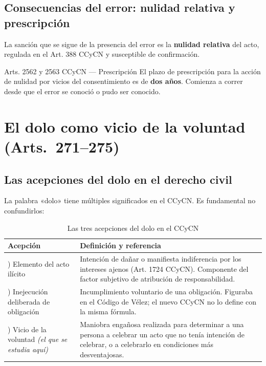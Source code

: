 \documentclass[12pt,oneside]{book}
\begin{document}
\section{Consecuencias del error: nulidad relativa y prescripción}

La sanción que se sigue de la presencia del error es la \textbf{nulidad relativa} del acto, regulada en el Art. 388 CCyCN y susceptible de confirmación.

\begin{articulo}{Arts. 2562 y 2563 CCyCN --- Prescripción}
El plazo de prescripción para la acción de nulidad por vicios del consentimiento es de \textbf{dos años}. Comienza a correr desde que el error se conoció o pudo ser conocido.
\end{articulo}

\chapter{El dolo como vicio de la voluntad (Arts.~271--275)}

\section{Las acepciones del dolo en el derecho civil}

La palabra «dolo» tiene múltiples significados en el CCyCN. Es fundamental no confundirlos:

\begin{table}[H]
\centering
\begin{tabularx}{\textwidth}{>{\raggedright\arraybackslash}p{} >{\raggedright\arraybackslash}X}
\toprule
\textbf{Acepción} & \textbf{Definición y referencia} \\
\midrule
1) Elemento del acto ilícito & Intención de dañar o manifiesta indiferencia por los intereses ajenos (Art. 1724 CCyCN). Componente del factor subjetivo de atribución de responsabilidad. \\[4pt]
2) Inejecución deliberada de obligación & Incumplimiento voluntario de una obligación. Figuraba en el Código de Vélez; el nuevo CCyCN no lo define con la misma fórmula. \\[4pt]
3) Vicio de la voluntad \emph{(el que se estudia aquí)} & Maniobra engañosa realizada para determinar a una persona a celebrar un acto que no tenía intención de celebrar, o a celebrarlo en condiciones más desventajosas. \\
\bottomrule
\end{tabularx}
\caption{Las tres acepciones del dolo en el CCyCN}
\end{table}
\end{document}
